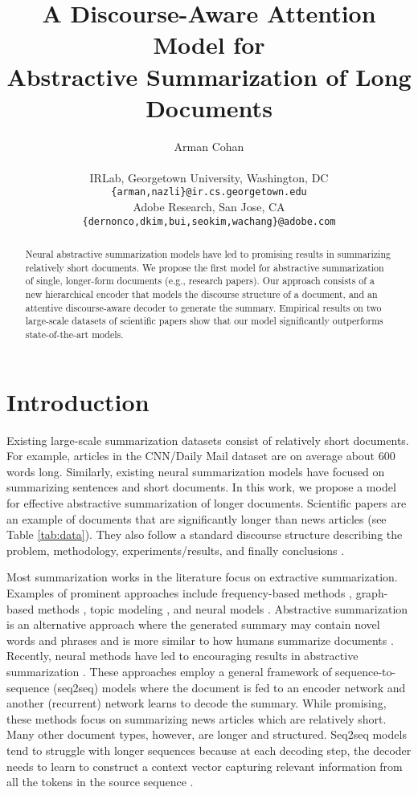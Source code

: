 \documentclass[11pt,a4paper]{article}
\title{A Discourse-Aware Attention Model for \\Abstractive Summarization of Long Documents}
\author{
  {Arman Cohan}
  \quad {Franck Dernoncourt}
  \quad {Doo Soon Kim}
  \quad {Trung Bui} \\
  \quad {\textbf{Seokhwan Kim}}
  \quad {\textbf{Walter Chang}}
  \quad {\textbf{Nazli Goharian}} \vspace{6pt} \\
IRLab, Georgetown University, Washington, DC \\
  {\small \tt \{arman,nazli\}@ir.cs.georgetown.edu} \vspace{4pt}\\
  Adobe Research, San Jose, CA\\
  {\small \tt \{dernonco,dkim,bui,seokim,wachang\}@adobe.com}
  }
\date{}
\begin{document}
\maketitle
\begin{abstract}
Neural abstractive summarization models have led to promising results in summarizing relatively short documents. We propose the first model for abstractive summarization of single, longer-form documents (e.g., research papers). Our approach consists of a new hierarchical encoder that models the discourse structure of a document, and an attentive discourse-aware decoder to generate the summary.
Empirical results on two large-scale datasets of scientific papers show that our model significantly outperforms state-of-the-art models.
\end{abstract}

\section{Introduction}

Existing large-scale summarization datasets consist of relatively short documents. For example, articles in the CNN/Daily Mail dataset \cite{hermann2015teaching} are on average about 600 words long. Similarly, existing neural summarization models have focused on summarizing sentences and short documents.
In this work, we propose a model for effective abstractive summarization of longer documents.
Scientific papers are an example of documents that are significantly longer than news articles (see Table \ref{tab:data}). They also follow a standard discourse structure describing the problem, methodology, experiments/results, and finally conclusions \cite{Suppe1998-SUPTSO}.


Most summarization works in the literature focus on extractive summarization. Examples of prominent approaches include frequency-based methods \cite{vanderwende2007beyond}, graph-based methods \cite{erkan2004lexrank}, topic modeling \cite{steinberger2004using}, and neural models \cite{nallapati2017summarunner}. Abstractive summarization is an alternative approach where the generated summary may contain novel words and phrases and is more similar to how humans summarize documents \cite{jing2002using}. Recently, neural methods have led to encouraging results in abstractive summarization \cite{nallapati2016abstractive,see2017get,paulus2017deep,li2017cascaded}. These approaches employ a general framework of sequence-to-sequence (seq2seq) models \cite{sutskever2014sequence} where the document is fed to an encoder network and another (recurrent) network learns to decode the summary. While promising, these methods focus on summarizing news articles which are relatively short. Many other document types, however, are longer and structured. Seq2seq models tend to struggle with longer sequences because at each decoding step, the decoder needs to learn to construct a context vector capturing relevant information from all the tokens in the source sequence \cite{shao2017generating}.
\end{document}
